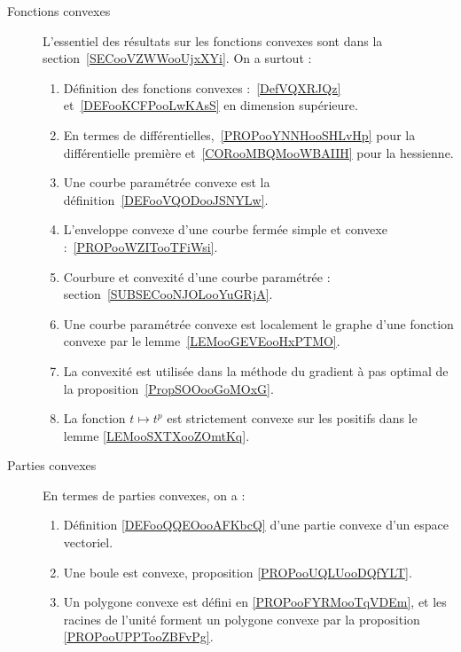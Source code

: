 
\begin{description}
	\item[Fonctions convexes]
	      L'essentiel des résultats sur les fonctions convexes sont dans la section~\ref{SECooVZWWooUjxXYi}. On a surtout :
	      \begin{enumerate}
		      \item
		            Définition des fonctions convexes :~\ref{DefVQXRJQz} et~\ref{DEFooKCFPooLwKAsS} en dimension supérieure.
		      \item
		            En termes de différentielles,~\ref{PROPooYNNHooSHLvHp} pour la différentielle première et~\ref{CORooMBQMooWBAIIH} pour la hessienne.
		      \item
		            Une courbe paramétrée convexe est la définition~\ref{DEFooVQODooJSNYLw}.
		      \item
		            L'enveloppe convexe d'une courbe fermée simple et convexe :~\ref{PROPooWZITooTFiWsi}.
		      \item
		            Courbure et convexité d'une courbe paramétrée : section~\ref{SUBSECooNJOLooYuGRjA}.
		      \item
		            Une courbe paramétrée convexe est localement le graphe d'une fonction convexe par le lemme~\ref{LEMooGEVEooHxPTMO}.
		      \item
		            La convexité est utilisée dans la méthode du gradient à pas optimal de la proposition~\ref{PropSOOooGoMOxG}.
		      \item
		            La fonction \( t\mapsto t^p\) est strictement convexe sur les positifs dans le lemme \ref{LEMooSXTXooZOmtKq}.
	      \end{enumerate}
	\item[Parties convexes]

	      En termes de parties convexes, on a :
	      \begin{enumerate}
		      \item
		            Définition \ref{DEFooQQEOooAFKbcQ} d'une partie convexe d'un espace vectoriel.
		      \item
		            Une boule est convexe, proposition \ref{PROPooUQLUooDQfYLT}.
                \item
                    Un polygone convexe est défini en \ref{PROPooFYRMooTqVDEm}, et les racines de l'unité forment un polygone convexe par la proposition \ref{PROPooUPPTooZBFvPg}.
	      \end{enumerate}
\end{description}

